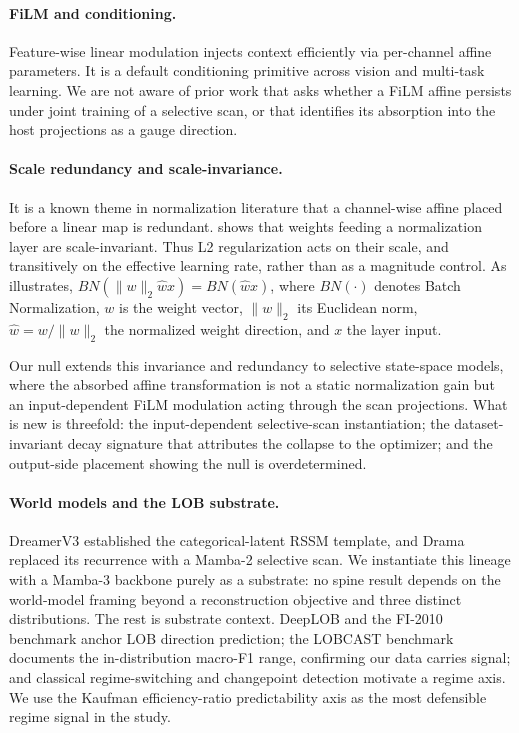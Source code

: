 \documentclass{article}
\begin{document}
\paragraph{FiLM and conditioning.} Feature-wise linear modulation \citep{perez2018film} injects context efficiently via per-channel affine parameters. It is a default conditioning primitive across vision and multi-task learning. We are not aware of prior work that asks whether a FiLM affine persists under joint training of a selective scan, or that identifies its absorption into the host projections as a gauge direction.

\paragraph{Scale redundancy and scale-invariance.} It is a known theme in normalization literature that a channel-wise affine placed before a linear map is redundant. \citet{vanlaarhoven2017l2} shows that weights feeding a normalization layer are scale-invariant. Thus L2 regularization acts on their scale, and transitively on the effective learning rate, rather than as a magnitude control. As \citet{hoffer2018norm} illustrates, $BN(\|w\|_2 \hat{w} x) = BN(\hat{w} x)$, where $BN(\cdot)$ denotes Batch Normalization, $w$ is the weight vector, $\|w\|_2$ its Euclidean norm, $\hat{w}=w/\|w\|_2$ the normalized weight direction, and $x$ the layer input.

Our null extends this invariance and redundancy to selective state-space models, where the absorbed affine transformation is not a static normalization gain but an input-dependent FiLM modulation acting through the scan projections. What is new is threefold: the input-dependent selective-scan instantiation; the dataset-invariant decay signature that attributes the collapse to the optimizer; and the output-side placement showing the null is overdetermined.

\paragraph{World models and the LOB substrate.} DreamerV3 \citep{hafner2023dreamerv3} established the categorical-latent RSSM template, and Drama \citep{wang2025drama} replaced its recurrence with a Mamba-2 selective scan. We instantiate this lineage with a Mamba-3 backbone purely as a substrate: no spine result depends on the world-model framing beyond a reconstruction objective and three distinct distributions. The rest is substrate context. DeepLOB \citep{zhang2019deeplob} and the FI-2010 benchmark \citep{ntakaris2018benchmark} anchor LOB direction prediction; the LOBCAST benchmark \citep{prata2023lobcast} documents the in-distribution macro-F1 range, confirming our data carries signal; and classical regime-switching \citep{hamilton1989new} and changepoint detection \citep{adams2007bayesian} motivate a regime axis. We use the Kaufman efficiency-ratio predictability axis as the most defensible regime signal in the study.
\end{document}

